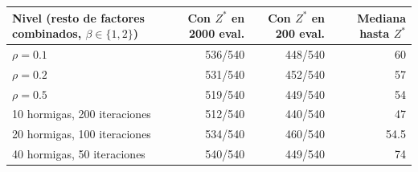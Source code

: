\begin{tabular}{lrrr}\toprule
Nivel (resto de factores combinados, $\beta\in\{1,2\}$) & Con $Z^*$ en 2000 eval. & Con $Z^*$ en 200 eval. & Mediana hasta $Z^*$\\\midrule
$\rho = 0.1$ & 536/540 & 448/540 & 60\\
$\rho = 0.2$ & 531/540 & 452/540 & 57\\
$\rho = 0.5$ & 519/540 & 449/540 & 54\\
10 hormigas, 200 iteraciones & 512/540 & 440/540 & 47\\
20 hormigas, 100 iteraciones & 534/540 & 460/540 & 54.5\\
40 hormigas, 50 iteraciones & 540/540 & 449/540 & 74\\
\bottomrule\end{tabular}
